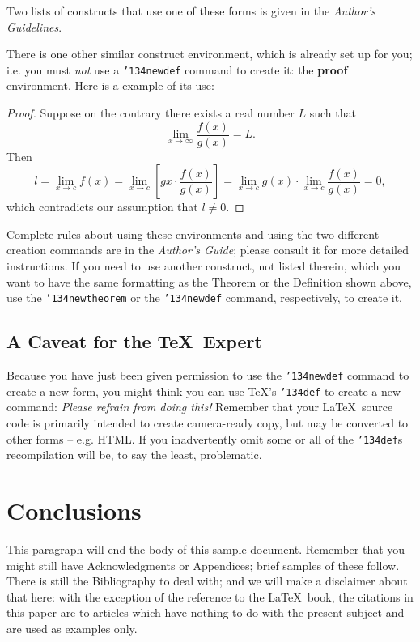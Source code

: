 \documentclass{sig-alternate2-pods09}
\begin{document}
Two lists of constructs that use one of these
forms is given in the
\textit{Author's  Guidelines}.

There is one other similar construct environment, which is
already set up
for you; i.e. you must \textit{not} use
a \texttt{{\char'134}newdef} command to
create it: the \textbf{proof} environment.  Here
is a example of its use:
\begin{proof}
Suppose on the contrary there exists a real number $L$ such that
\begin{displaymath}
\lim_{x\rightarrow\infty} \frac{f(x)}{g(x)} = L.
\end{displaymath}
Then
\begin{displaymath}
l=\lim_{x\rightarrow c} f(x) = \lim_{x\rightarrow c} \left[ g{x}
\cdot \frac{f(x)}{g(x)} \right ] = \lim_{x\rightarrow c} g(x) \cdot
\lim_{x\rightarrow c} \frac{f(x)}{g(x)} =  0,
\end{displaymath}
which contradicts our assumption that $l\neq 0$.
\end{proof}

Complete rules about using these environments and using the
two different creation commands are in the
\textit{Author's Guide}; please consult it for more
detailed instructions.  If you need to use another construct,
not listed therein, which you want to have the same
formatting as the Theorem
or the Definition\cite{salas:calculus} shown above,
use the \texttt{{\char'134}newtheorem} or the
\texttt{{\char'134}newdef} command,
respectively, to create it.

\subsection*{A {\secit Caveat} for the \TeX\ Expert}
Because you have just been given permission to
use the \texttt{{\char'134}newdef} command to create a
new form, you might think you can
use \TeX's \texttt{{\char'134}def} to create a
new command: \textit{Please refrain from doing this!}
Remember that your \LaTeX\ source code is primarily intended
to create camera-ready copy, but may be converted
to other forms -- e.g. HTML. If you inadvertently omit
some or all of the \texttt{{\char'134}def}s recompilation will
be, to say the least, problematic.

\section{Conclusions}
This paragraph will end the body of this sample document.
Remember that you might still have Acknowledgments or
Appendices; brief samples of these
follow.  There is still the Bibliography to deal with; and
we will make a disclaimer about that here: with the exception
of the reference to the \LaTeX\ book, the citations in
this paper are to articles which have nothing to
do with the present subject and are used as
examples only.
\end{document}
